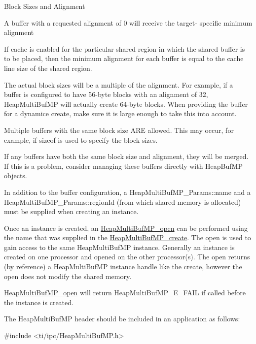 Block Sizes and Alignment
\begin{DoxyItemize}
\item A buffer with a requested alignment of 0 will receive the target-\/ specific minimum alignment
\item If cache is enabled for the particular shared region in which the shared buffer is to be placed, then the minimum alignment for each buffer is equal to the cache line size of the shared region.
\item The actual block sizes will be a multiple of the alignment. For example, if a buffer is configured to have 56-\/byte blocks with an alignment of 32, HeapMultiBufMP will actually create 64-\/byte blocks. When providing the buffer for a dynamice create, make sure it is large enough to take this into account.
\item Multiple buffers with the same block size ARE allowed. This may occur, for example, if sizeof is used to specify the block sizes.
\item If any buffers have both the same block size and alignment, they will be merged. If this is a problem, consider managing these buffers directly with HeapBufMP objects.
\end{DoxyItemize}

In addition to the buffer configuration, a HeapMultiBufMP\_\-Params::name and a HeapMultiBufMP\_\-Params::regionId (from which shared memory is allocated) must be supplied when creating an instance.

Once an instance is created, an \hyperlink{_heap_multi_buf_m_p_8h_a0fe88a611f390024e0772876546084cc}{HeapMultiBufMP\_\-open} can be performed using the name that was supplied in the \hyperlink{_heap_multi_buf_m_p_8h_a76b4a6dc8007ad99b598aa5a64b0d955}{HeapMultiBufMP\_\-create}. The open is used to gain access to the same HeapMultiBufMP instance. Generally an instance is created on one processor and opened on the other processor(s). The open returns (by reference) a HeapMultiBufMP instance handle like the create, however the open does not modify the shared memory.

\hyperlink{_heap_multi_buf_m_p_8h_a0fe88a611f390024e0772876546084cc}{HeapMultiBufMP\_\-open} will return HeapMultiBufMP\_\-E\_\-FAIL if called before the instance is created.

The HeapMultiBufMP header should be included in an application as follows: 
\begin{DoxyCode}
  #include <ti/ipc/HeapMultiBufMP.h>
\end{DoxyCode}


